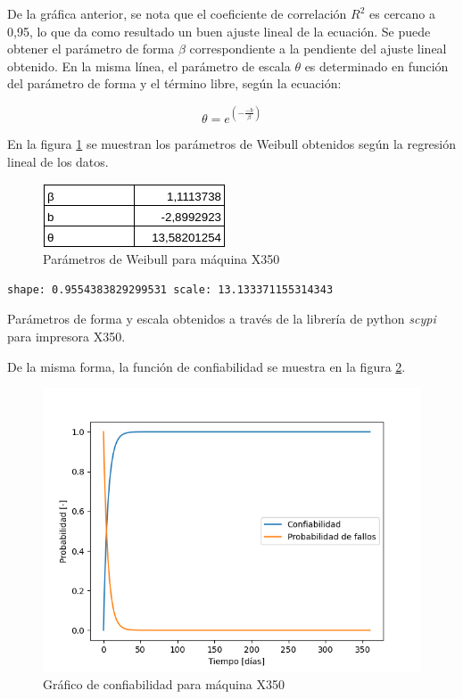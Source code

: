 De la gráfica anterior, se nota que el coeficiente de correlación $R^2$ es cercano a 0,95, lo que da como resultado un buen ajuste lineal de la ecuación. Se puede obtener el parámetro de forma $\beta$ correspondiente a la pendiente del ajuste lineal obtenido. En la misma línea, el parámetro de escala $\theta$ es determinado en función del parámetro de forma y el término libre, según la ecuación:

\begin{equation}
\theta=e^{\left(-\frac{-b}{\beta}\right)}
\end{equation}

En la figura \ref{paramx350} se muestran los parámetros de Weibull obtenidos según la regresión lineal de los datos.

\begin{figure}[H]
\centering
\includegraphics[scale=0.9]{images/paramx350.png}
\caption{Parámetros de Weibull para máquina X350}
\label{paramx350}
\end{figure}

\begin{table}[H]
\begin{lstlisting}
shape: 0.9554383829299531 scale: 13.133371155314343
\end{lstlisting}
\caption{Parámetros de forma y escala obtenidos a través de la librería de python \textit{scypi} para impresora X350.}
\end{table}

De la misma forma, la función de confiabilidad se muestra en la figura \ref{confx350}.

\begin{figure}[H]
\centering
\includegraphics[scale=0.9]{images/confx350.png}
\caption{Gráfico de confiabilidad para máquina X350}
\label{confx350}
\end{figure}

